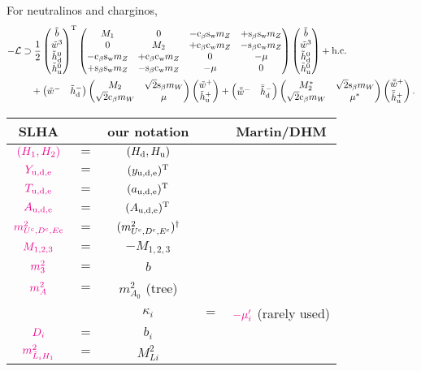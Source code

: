 \documentclass[CheatSheet]{subfiles}
\begin{document}
For neutralinos and charginos,
\begin{equation}
\begin{split}
  -\mathcal L&\supset
 \frac12\pmat{\tib\\\tiw^3\\\thdz\\\thuz}^\TT
 \pmat{
 M_1&0&-\co\beta\sw m_Z&+\si\beta\sw m_Z \\
 0&M_2&+\co\beta\cw m_Z&-\si\beta\cw m_Z \\
 -\co\beta\sw m_Z&+\co\beta\cw m_Z&0&-\mu \\
 +\si\beta\sw m_Z&-\si\beta\cw m_Z&-\mu&0
 }
 \pmat{\tib\\\tiw^3\\\thdz\\\thuz} + \text{h.c.}
\\&\quad
+\pmat{\tiw^- & \thdm}
\pmat{ M_2& \sqrt2\si\beta m_W\\ \sqrt2\co\beta m_W& \mu}
\pmat{\tiw^+ \\ \thup}
+\pmat{\bar\tiw^- & \bthdm}
\pmat{ M_2^*& \sqrt2\si\beta m_W\\ \sqrt2\co\beta m_W& \mu^*}
\pmat{\bar\tiw^+ \\ \bthup}.
\end{split}
\end{equation}

\newpage
\begin{wraptable}{r}{200pt}\vspace{-3em}
 \begin{tabular}[t]{c@{\,}c@{\,}c@{\,}c@{\,}c}\toprule
 SLHA  && our notation && Martin/DHM\\\midrule
 $\col (H_1, H_2)$              &$=$& $(\Hd, \Hu)$ \\\midrule
 $\col Y_{\mathrm{u,d,e}}$      &$=$& $(y_{\mathrm{u,d,e}})^\TT$\\
 $\col T_{\mathrm{u,d,e}}$      &$=$& $(a_{\mathrm{u,d,e}})^\TT$\\
 $\col A_{\mathrm{u,d,e}}$      &$=$& $(A_{\mathrm{u,d,e}})^\TT$\\
 $\col m^2_{U^\cc,D^\cc, E\cc}$ &$=$& $(m^2_{U^\cc,D^\cc, E^\cc})^\dagger$\\
 $\col M_{1,2,3}$               &$=$& $-M_{1,2,3}$\\
 $\col m_3^2$                   &$=$& $b$\\
 $\col m_A^2$                   &$=$& $m^2_{A_0}$ (tree)\\\midrule
                           &&$\kappa_i$ &$=$& $\col -\mu_i'$ \footnotesize{(rarely used)}\\
 $\col D_i$                     &$=$& $b_i$\\
 $\col m^2_{\tilde L_iH_1}$     &$=$& $M^2_{Li}$ \\\bottomrule
 \end{tabular}
\end{wraptable}
\end{document}
